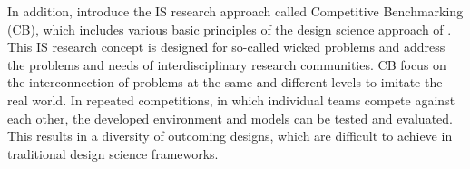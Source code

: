 In addition,  introduce the IS research approach called Competitive Benchmarking (CB),
which includes various basic principles of the design science approach of .
This IS research concept is designed for so-called wicked problems and address the problems and needs of interdisciplinary
research communities. CB focus on the interconnection of problems at the same and different levels to imitate the real world.
In repeated competitions, in which individual teams compete against each other, the developed environment and models
can be tested and evaluated. This results in a diversity of outcoming designs, which are difficult to achieve in
traditional design science frameworks.

\clearpage